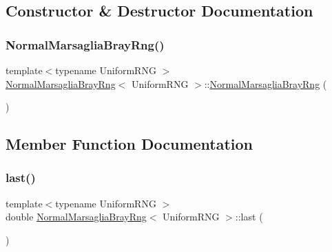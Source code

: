 \subsection{Constructor \& Destructor Documentation}
\hypertarget{class_normal_marsaglia_bray_rng_a4d225dedc26e6dcf154a2902827b2ede}{}\label{class_normal_marsaglia_bray_rng_a4d225dedc26e6dcf154a2902827b2ede} 
\subsubsection{\texorpdfstring{Normal\+Marsaglia\+Bray\+Rng()}{NormalMarsagliaBrayRng()}}
{\footnotesize\ttfamily template$<$typename Uniform\+R\+NG $>$ \\
\hyperlink{class_normal_marsaglia_bray_rng}{Normal\+Marsaglia\+Bray\+Rng}$<$ Uniform\+R\+NG $>$\+::\hyperlink{class_normal_marsaglia_bray_rng}{Normal\+Marsaglia\+Bray\+Rng} (\begin{DoxyParamCaption}{ }\end{DoxyParamCaption})\hspace{0.3cm}{\ttfamily [inline]}}



\subsection{Member Function Documentation}
\hypertarget{class_normal_marsaglia_bray_rng_af90ac458fcbf302dfad98816132658c2}{}\label{class_normal_marsaglia_bray_rng_af90ac458fcbf302dfad98816132658c2} 
\subsubsection{\texorpdfstring{last()}{last()}}
{\footnotesize\ttfamily template$<$typename Uniform\+R\+NG $>$ \\
double \hyperlink{class_normal_marsaglia_bray_rng}{Normal\+Marsaglia\+Bray\+Rng}$<$ Uniform\+R\+NG $>$\+::last (\begin{DoxyParamCaption}{ }\end{DoxyParamCaption})\hspace{0.3cm}{\ttfamily [inline]}}

